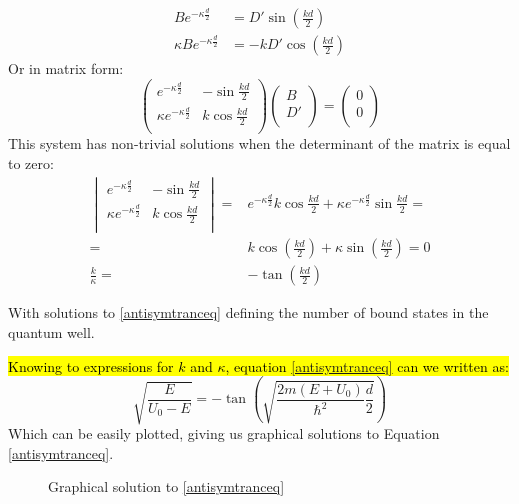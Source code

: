 				\begin{align}
					Be^{-\kappa \frac{d}{2}} &= D' \sin(\frac{kd}{2}) \\
					\kappa Be^{-\kappa \frac{d}{2}} &= -kD' \cos(\frac{kd}{2})			
				\end{align}
				Or in matrix form:
				\begin{equation}
				\begin{pmatrix}
				e^{-\kappa \frac{d}{2}}			&	-\sin{\frac{kd}{2}}	\\ 
				\kappa e^{-\kappa \frac{d}{2}}	&	k\cos{\frac{kd}{2}}	\\
				\end{pmatrix}
				\begin{pmatrix}
				B \\
				D' \\
				\end{pmatrix}
				=
				\begin{pmatrix}
				0 \\
				0 \\
				\end{pmatrix}			
				\end{equation}
				This system has non-trivial solutions when the determinant of the matrix is equal to zero:
				\begin{align}
					\begin{vmatrix}
						e^{-\kappa \frac{d}{2}}			&	-\sin{\frac{kd}{2}}	\\ 
						\kappa e^{-\kappa \frac{d}{2}}	&	k\cos{\frac{kd}{2}}	\\
					\end{vmatrix}
					=& e^{-\kappa\frac{d}{2}} k\cos{\frac{kd}{2}} + \kappa e^{-\kappa \frac{d}{2}} \sin{\frac{kd}{2}} =\\
					=& k\cos(\frac{kd}{2}) + \kappa\sin(\frac{kd}{2}) = 0 \\
					\frac{k}{\kappa} =& -\tan(\frac{kd}{2}) \label{antisymtranceq}
				\end{align}
				
				With solutions to \ref{antisymtranceq} defining the number of bound states in the quantum well. 
				
				\hl{Knowing to expressions for $k$ and $\kappa$, equation \ref{antisymtranceq} can we written as:}
				\begin{equation}
				\sqrt{\frac{E}{U_0-E}} = -\tan\left(\sqrt{\frac{2m(E+U_0)}{\hbar^2}\frac{d}{2}}\right)
				\end{equation}
				Which can be easily plotted, giving us graphical solutions to Equation \ref{antisymtranceq}.
				\begin{figure}[!h]
					\centering
					
					\caption{Graphical solution to \ref{antisymtranceq}}
				\end{figure}
				
